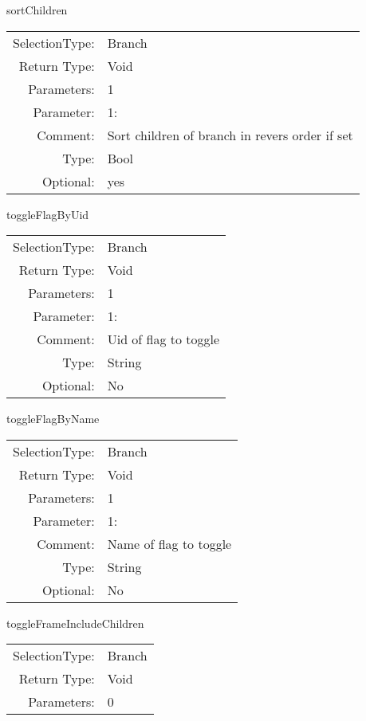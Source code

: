 \item sortChildren\\
\begin{tabular}{rl}
  SelectionType: & Branch\\
    Return Type: & Void\\
     Parameters: & 1\\
   Parameter: &  1:\\
        Comment: & Sort children of branch in revers order if set\\
           Type: & Bool\\
       Optional: &  yes\\
\end{tabular}

\item toggleFlagByUid\\
\begin{tabular}{rl}
  SelectionType: & Branch\\
    Return Type: & Void\\
     Parameters: & 1\\
   Parameter: &  1:\\
        Comment: & Uid of flag to toggle\\
           Type: & String\\
       Optional: &  No\\
\end{tabular}

\item toggleFlagByName\\
\begin{tabular}{rl}
  SelectionType: & Branch\\
    Return Type: & Void\\
     Parameters: & 1\\
   Parameter: &  1:\\
        Comment: & Name of flag to toggle\\
           Type: & String\\
       Optional: &  No\\
\end{tabular}

\item toggleFrameIncludeChildren\\
\begin{tabular}{rl}
  SelectionType: & Branch\\
    Return Type: & Void\\
     Parameters: & 0\\
\end{tabular}

